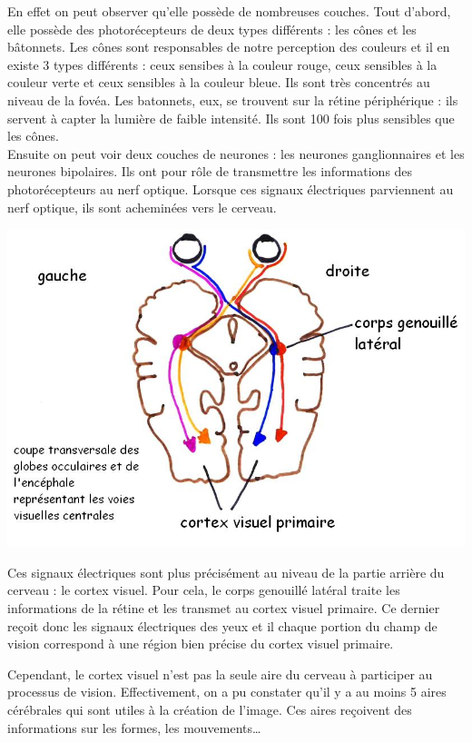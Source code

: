 \documentclass[12pt, a4paper]{report}
\begin{document}
En effet on peut observer qu'elle possède de nombreuses couches. Tout d'abord, elle possède des photorécepteurs de deux types différents : les cônes et les bâtonnets. Les cônes sont responsables de notre perception des couleurs et il en existe 3 types différents : ceux sensibes à la couleur rouge, ceux sensibles à la couleur verte et ceux sensibles à la couleur bleue. Ils sont très concentrés au niveau de la fovéa. Les batonnets, eux, se trouvent sur la rétine périphérique : ils servent à capter la lumière de faible intensité. Ils sont 100 fois plus sensibles que les cônes.\\
Ensuite on peut voir deux couches de neurones : les neurones ganglionnaires et les neurones bipolaires. Ils ont pour rôle de transmettre les informations des photorécepteurs au nerf optique. Lorsque ces signaux électriques parviennent au nerf optique, ils sont acheminées vers le cerveau.\\

\begin{center}
\includegraphics[scale=0.4]{cerveau.jpg}
\end{center}

Ces signaux électriques sont plus précisément au niveau de la partie arrière du cerveau : le cortex visuel. Pour cela, le corps genouillé latéral traite les informations de la rétine et les transmet au cortex visuel primaire. Ce dernier reçoit donc les signaux électriques des yeux et il chaque portion du champ de vision correspond à une région bien précise du cortex visuel primaire.

Cependant, le cortex visuel n'est pas la seule aire du cerveau à participer au processus de vision. Effectivement, on a pu constater qu'il y a au moins 5 aires cérébrales qui sont utiles à la création de l'image. Ces aires reçoivent des informations sur les formes, les mouvements\ldots{}
\end{document}
